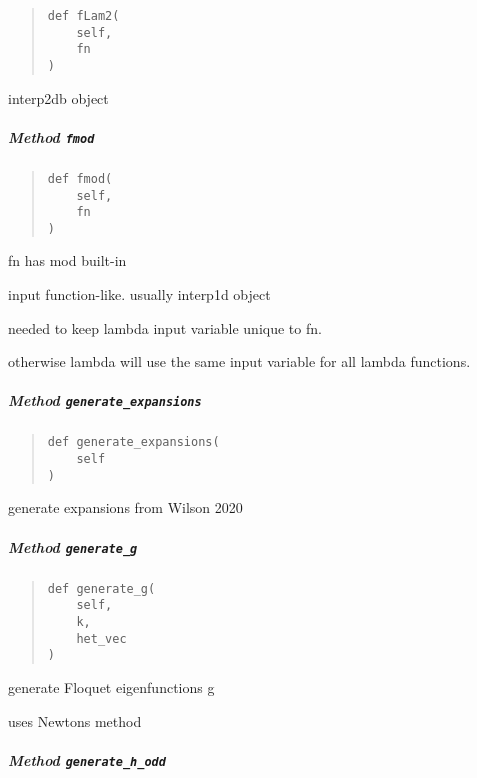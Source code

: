 \documentclass[
  english,
  a4paper,
  oneside]{article}
\begin{document}
\begin{quote}
\begin{verbatim}
def fLam2(
    self,
    fn
)
\end{verbatim}
\end{quote}

interp2db object

\hypertarget{StrongCoupling.StrongCoupling.fmod}{%
\subparagraph{\texorpdfstring{Method
\texttt{fmod}}{Method fmod}}\label{StrongCoupling.StrongCoupling.fmod}}

\begin{quote}
\begin{verbatim}
def fmod(
    self,
    fn
)
\end{verbatim}
\end{quote}

fn has mod built-in

input function-like. usually interp1d object

needed to keep lambda input variable unique to fn.

otherwise lambda will use the same input variable for all lambda
functions.

\hypertarget{StrongCoupling.StrongCoupling.generate_expansions}{%
\subparagraph{\texorpdfstring{Method
\texttt{generate\_expansions}}{Method generate\_expansions}}\label{StrongCoupling.StrongCoupling.generate_expansions}}

\begin{quote}
\begin{verbatim}
def generate_expansions(
    self
)
\end{verbatim}
\end{quote}

generate expansions from Wilson 2020

\hypertarget{StrongCoupling.StrongCoupling.generate_g}{%
\subparagraph{\texorpdfstring{Method
\texttt{generate\_g}}{Method generate\_g}}\label{StrongCoupling.StrongCoupling.generate_g}}

\begin{quote}
\begin{verbatim}
def generate_g(
    self,
    k,
    het_vec
)
\end{verbatim}
\end{quote}

generate Floquet eigenfunctions g

uses Newtons method

\hypertarget{StrongCoupling.StrongCoupling.generate_h_odd}{%
\subparagraph{\texorpdfstring{Method
\texttt{generate\_h\_odd}}{Method generate\_h\_odd}}\label{StrongCoupling.StrongCoupling.generate_h_odd}}
\end{document}
